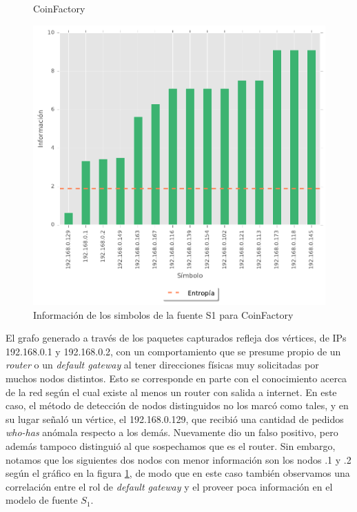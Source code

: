 \begin{figure}[H]
	\centering
	\caption{CoinFactory}
	
\end{figure}

\begin{figure}[H]
  \begin{center}
    \includegraphics[scale = 0.5]{img/Pyme-information-S1.pdf}
    \caption{Información de los simbolos de la fuente S1 para CoinFactory}
    \label{informacion_pyme}
  \end{center}
\end{figure}

El grafo generado a través de los paquetes capturados refleja dos vértices, de IPs 192.168.0.1 y 192.168.0.2, con un comportamiento que se presume propio de un \textit{router} o un \textit{default gateway} al tener direcciones físicas muy solicitadas por muchos nodos distintos. Esto se corresponde en parte con el conocimiento acerca de la red según el cual existe al menos un router con salida a internet. En este caso, el método de detección de nodos distinguidos no los marcó como tales, y en su lugar señaló un vértice, el 192.168.0.129, que recibió una cantidad de pedidos \textit{who-has} anómala respecto a los demás. Nuevamente dio un falso positivo, pero además tampoco distinguió al que sospechamos que es el router. Sin embargo, notamos que los siguientes dos nodos con menor información son los nodos .1 y .2 según el gráfico en la figura \ref{informacion_pyme}, de modo que en este caso también observamos una correlación entre el rol de \textit{default gateway} y el proveer poca información en el modelo de fuente $S_1$.

